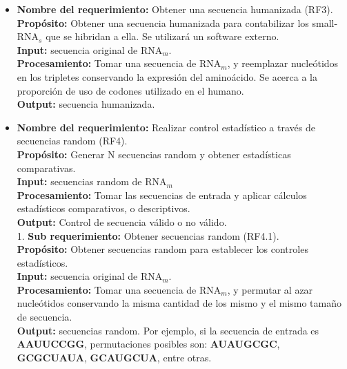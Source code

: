 \documentclass[12pt,a4paper,spanish]{article}
\begin{document}
\begin{itemize}
		\item \textbf{Nombre del requerimiento:} Obtener una secuencia humanizada (RF3).\\
 	    \textbf{Propósito:} Obtener una secuencia humanizada para contabilizar los small-RNA$_s$ 
							que se hibridan a ella. Se utilizará un software externo.\\
		\textbf{Input:} secuencia original de RNA$_m$.\\
		\textbf{Procesamiento:} Tomar una secuencia de RNA$_m$, y reemplazar nucleótidos en los tripletes conservando la 									expresión del aminoácido. Se acerca a la proporción de uso de codones utilizado en el 									humano. \\
		\textbf{Output:} secuencia humanizada.\\


		\item \textbf{Nombre del requerimiento:} Realizar control estadístico a través de secuencias random (RF4).\\
 	    \textbf{Propósito:} Generar N secuencias random y obtener estadísticas comparativas. \\
		\textbf{Input:} secuencias random de RNA$_m$ \\
		\textbf{Procesamiento:} Tomar las secuencias de entrada y aplicar cálculos estadísticos comparativos, o 								descriptivos. \\
		\textbf{Output:} Control de secuencia válido o no válido. \\

		1. \textbf{Sub requerimiento:} Obtener secuencias random (RF4.1).\\
 	    \textbf{Propósito:} Obtener secuencias random para establecer los controles estadísticos.\\
		\textbf{Input:} secuencia original de RNA$_m$.\\
		\textbf{Procesamiento:} Tomar una secuencia de RNA$_m$, y permutar al azar nucleótidos conservando la misma 								cantidad de los mismo y el mismo tamaño de secuencia. \\
		\textbf{Output:} secuencias random. Por ejemplo, si la secuencia de entrada es \textbf{AAUUCCGG}, permutaciones 						posibles son: \textbf{AUAUGCGC}, \textbf{GCGCUAUA}, \textbf{GCAUGCUA}, entre otras.	\\


\end{itemize}
\end{document}
